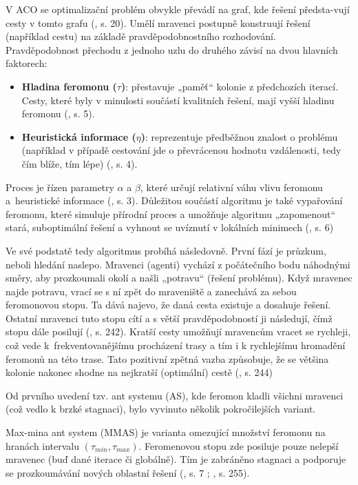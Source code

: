 \documentclass[a4paper, twoside, 12pt, czech]{article}
\begin{document}
V ACO se optimalizační problém obvykle převádí na graf, kde řešení předsta-vují
cesty v tomto grafu (\cite{Fidanova2021-qg}, s. 20). Umělí mravenci postupně 
konstruují řešení (například
cestu) na základě pravděpodobnostního rozhodování. Pravděpodobnost přechodu z 
jednoho uzlu do druhého závisí na dvou hlavních faktorech:
\begin{itemize}
    \item \textbf{Hladina feromonu ($\tau$)}: přestavuje „paměť“ kolonie z předchozích iterací. 
    Cesty, které byly v minulosti součástí kvalitních řešení, mají vyšší hladinu
    feromonu (\cite{Fidanova2021-qg}, s. 5).
    \item \textbf{Heuristická informace ($\eta$)}: reprezentuje předběžnou znalost o problému (na\-příklad 
    v případě cestování jde o převrácenou hodnotu vzdálenosti, tedy čím blíže, tím 
    lépe) (\cite{Fidanova2021-qg}, s. 4).
\end{itemize}

Proces je řízen parametry $\alpha$ a $\beta$, které určují relativní váhu vlivu 
feromonu a~heuristické informace (\cite{Fidanova2021-qg}, s. 3). Důležitou součástí algoritmu je také 
vypařování feromonu, které simuluje přírodní proces a umožňuje algoritmu „zapomenout“
stará, suboptimální řešení a vyhnout se uvíznutí v lokálních minimech (\cite{Fidanova2021-qg}, s. 6)

Ve své podstatě tedy algoritmus probíhá následovně. První fází je průzkum, neboli
hledání naslepo. Mravenci (agenti) vychází z počátečního bodu náhodnými směry, aby 
prozkoumali okolí a našli „potravu“ (řešení problému). Když mravenec najde potravu,
vrací se s ní zpět do mraveniště a zanechává za sebou feromonovou stopu. Ta dává 
najevo, že daná cesta existuje a dosahuje řešení. Ostatní mravenci tuto stopu 
cítí a s větší pravděpodobností ji následují, čímž stopu dále posilují 
(\cite{evolutionaryOptimizationAlgos}, s. 242). Kratší cesty umožňují mravencům
vracet se rychleji, což vede k~frekventovanějšímu procházení trasy a tím i k 
rychlejšímu hromadění feromonů na této trase. Tato pozitivní zpětná vazba způsobuje,
že se většina kolonie nakonec shodne na nejkratší (optimální) cestě (\cite{evolutionaryOptimizationAlgos}, s. 244)

Od prvního uvedení tzv. ant systemu (AS), kde feromon kladli všichni mravenci (což 
vedlo k brzké stagnaci), bylo vyvinuto několik pokročilejších variant.

Max-mina ant system (MMAS) je varianta omezující množství feromonu na hranách
intervalu $(\tau_{min},\tau_{max})$. Feromenovou stopu zde posiluje pouze nelepší 
mravenec (buď dané iterace či globálně). Tím je zabráněno stagnaci a podporuje se
prozkoumávání nových oblastní řešení (\cite{Fidanova2021-qg}, s. 7 ; \cite{evolutionaryOptimizationAlgos}, s. 255).
\end{document}
